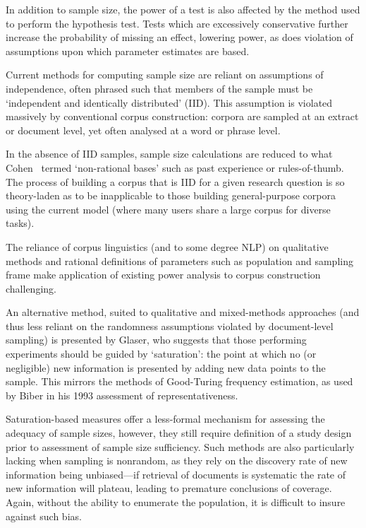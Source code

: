In addition to sample size, the power of a test is also affected by the method used to perform the hypothesis test.  Tests which are excessively conservative further increase the probability of missing an effect, lowering power, as does violation of assumptions upon which parameter estimates are based.

Current methods for computing sample size are reliant on assumptions of independence, often phrased such that members of the sample must be `independent and identically distributed' (IID).  This assumption is violated massively by conventional corpus construction: corpora are sampled at an extract or document level, yet often analysed at a word or phrase level.

In the absence of IID samples, sample size calculations are reduced to what Cohen~\cite[p. 145]{cohen1977statistical} termed `non-rational bases' such as past experience or rules-of-thumb.  The process of building a corpus that is IID for a given research question is so theory-laden as to be inapplicable to those building general-purpose corpora using the current model (where many users share a large corpus for diverse tasks).

The reliance of corpus linguistics (and to some degree NLP) on qualitative methods and rational definitions of parameters such as population and sampling frame make application of existing power analysis to corpus construction challenging.

An alternative method, suited to qualitative and mixed-methods approaches (and thus less reliant on the randomness assumptions violated by document-level sampling) is presented by Glaser\cite{glaser1965qualitative}, who suggests that those performing experiments should be guided by `saturation': the point at which no (or negligible) new information is presented by adding new data points to the sample.  This mirrors the methods of Good-Turing frequency estimation\cite{GOOD01121953}, as used by Biber in his 1993 assessment of representativeness\cite{biber1993representativeness}.

Saturation-based measures offer a less-formal mechanism for assessing the adequacy of sample sizes, however, they still require definition of a study design prior to assessment of sample size sufficiency.  Such methods are also particularly lacking when sampling is nonrandom, as they rely on the discovery rate of new information being unbiased---if retrieval of documents is systematic the rate of new information will plateau, leading to premature conclusions of coverage.  Again, without the ability to enumerate the population, it is difficult to insure against such bias.




